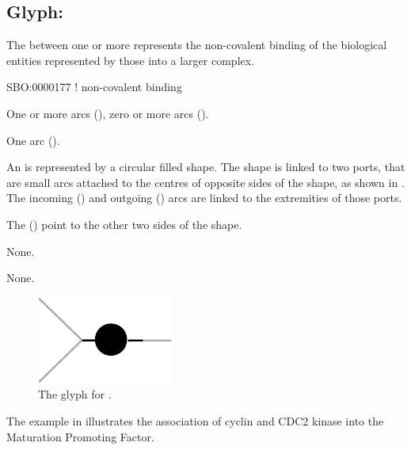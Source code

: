 \subsection{Glyph: }
\label{sec:association}

The  between one or more  represents the non-covalent binding of the biological entities represented by those  into a larger complex.

\begin{glyphDescription}

\glyphSboTerm
SBO:0000177 ! non-covalent binding

\glyphIncoming
One or more  arcs (), zero or more  arcs ().

\glyphOutgoing
One  arc ().

\glyphContainer
An  is represented by a circular filled shape.
The shape is linked to two ports, that are small arcs attached to the centres of opposite sides of the shape, as shown in .
The incoming  () and outgoing  () arcs are linked to the extremities of those ports.

The  () point to the other two sides of the shape.

\glyphLabel
None.

\glyphAux
None.

\end{glyphDescription}

\begin{figure}[H]
  \centering
  \includegraphics{images/build/association.pdf}
  \caption{The \PD glyph for .}
  \label{fig:association}
\end{figure}

The example in  illustrates the association of cyclin and CDC2 kinase into the Maturation Promoting Factor.


